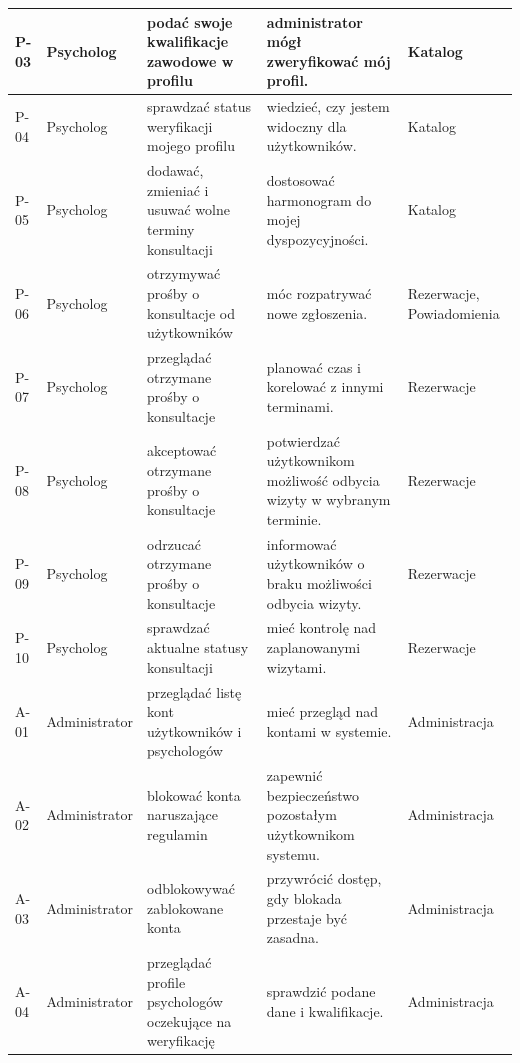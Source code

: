 \documentclass[11pt,a4paper]{article}
\begin{document}
\begin{xltabular}{\textwidth}{|p{1.1cm}|p{2.2cm}|Y|Y|p{2.4cm}|}
P-03 &
Psycholog &
podać swoje kwalifikacje zawodowe w profilu &
administrator mógł zweryfikować mój profil. &
Katalog \\
\hline
 
P-04 &
Psycholog &
sprawdzać status weryfikacji mojego profilu &
wiedzieć, czy jestem widoczny
dla użytkowników. &
Katalog \\
\hline
 
P-05 &
Psycholog &
dodawać, zmieniać i usuwać wolne terminy
konsultacji &
dostosować harmonogram do mojej
dyspozycyjności. &
Katalog \\
\hline
 
P-06 &
Psycholog &
otrzymywać prośby o konsultacje
od użytkowników &
móc rozpatrywać nowe zgłoszenia. &
Rezerwacje, Powiadomienia \\
\hline
 
P-07 &
Psycholog &
przeglądać otrzymane prośby o konsultacje &
planować czas i korelować z innymi terminami. &
Rezerwacje \\
\hline
 
P-08 &
Psycholog &
akceptować otrzymane prośby o konsultacje &
potwierdzać użytkownikom możliwość
odbycia wizyty w wybranym terminie. &
Rezerwacje \\
\hline
 
P-09 &
Psycholog &
odrzucać otrzymane prośby o konsultacje &
informować użytkowników o braku
możliwości odbycia wizyty. &
Rezerwacje \\
\hline
 
P-10 &
Psycholog &
sprawdzać aktualne statusy konsultacji &
mieć kontrolę nad zaplanowanymi wizytami. &
Rezerwacje \\
 
 
A-01 &
Administrator &
przeglądać listę kont użytkowników
i psychologów &
mieć przegląd nad kontami w systemie. &
Administracja \\
\hline
 
A-02 &
Administrator &
blokować konta naruszające regulamin &
zapewnić bezpieczeństwo pozostałym
użytkownikom systemu. &
Administracja \\
\hline
 
A-03 &
Administrator &
odblokowywać zablokowane konta &
przywrócić dostęp, gdy blokada
przestaje być zasadna. &
Administracja \\
\hline
 
A-04 &
Administrator &
przeglądać profile psychologów
oczekujące na weryfikację &
sprawdzić podane dane i kwalifikacje. &
Administracja \\
\hline
 

\end{xltabular}
\end{document}

